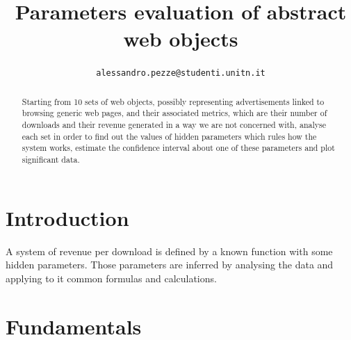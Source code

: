\documentclass[conference]{IEEEtran}
\begin{document}
\title{Parameters evaluation of abstract web objects}

\author{
    \texttt{alessandro.pezze@studenti.unitn.it}
}

\maketitle

\begin{abstract}
Starting from 10 sets of web objects, possibly representing advertisements linked to browsing generic web pages, and their associated metrics, which are their number of downloads and their revenue generated in a way we are not concerned with, analyse each set in order to find out the values of hidden parameters which rules how the system works, estimate the confidence interval about one of these parameters and plot significant data.
\end{abstract}

\section{Introduction}\label{sec:introduction}

A system of revenue per download is defined by a known function with some hidden parameters.  Those parameters are inferred by analysing the data and applying to it common formulas and calculations.

\section{Fundamentals}\label{sec:fundamentals}
\end{document}
